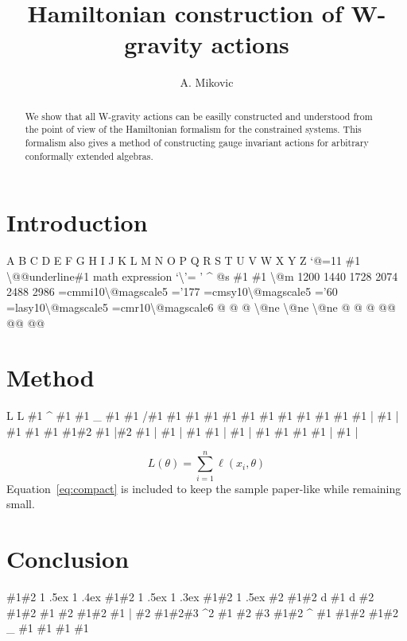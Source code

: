 \documentclass[11pt]{article}
\title{Hamiltonian construction of W-gravity actions}
\author{A. Mikovic}
\date{}
\begin{document}
\maketitle
\begin{abstract}

We show that all W-gravity actions can be easilly constructed and understood from the point of view of the Hamiltonian formalism for the constrained systems. This formalism also gives a method of constructing gauge invariant actions for arbitrary conformally extended algebras.

\end{abstract}

\section{Introduction}

A B C D E F G H I J K L M N O P Q R S T U V W X Y Z `@=11 \#1 \textbackslash{}@@underline\#1 math expression `\textbackslash{}'= ' \textasciicircum{} @s \#1 \#1 \textbackslash{}@m 1200 1440 1728 2074 2488 2986 =cmmi10\textbackslash{}@magscale5 ='177 =cmsy10\textbackslash{}@magscale5 ='60 =lasy10\textbackslash{}@magscale5 =cmr10\textbackslash{}@magscale6 @ @ @ \textbackslash{}@ne \textbackslash{}@ne \textbackslash{}@ne @ @ @ @@ @@ @@

\section{Method}

L L \#1 \textasciicircum{} \#1 \#1 \_ \#1 \#1 /\#1 \#1 \#1 \#1 \#1 \#1 \#1 \#1 \#1 \#1 \#1 \#1 | \#1 | \#1 \#1 \#1 \#1\#2 \#1 |\#2 \#1 | \#1 | \#1 \#1 | \#1 | \#1 \#1 \#1 \#1 | \#1 |

\begin{equation}
\label{eq:compact}
L(\theta) = \sum_{i=1}^{n} \ell(x_i, \theta)
\end{equation}
Equation~\ref{eq:compact} is included to keep the sample paper-like while remaining small.

\section{Conclusion}

\#1\#2 1 .5ex 1 .4ex \#1\#2 1 .5ex 1 .3ex \#1\#2 1 .5ex \#2 \#1\#2 d \#1 d \#2 \#1\#2 \#1 \#2 \#1\#2 \#1 | \#2 \#1\#2\#3 \textasciicircum{}2 \#1 \#2 \#3 \#1\#2 \textasciicircum{} \#1 \#1\#2 \#1\#2 \_ \#1 \#1 \#1 \#1
\end{document}
